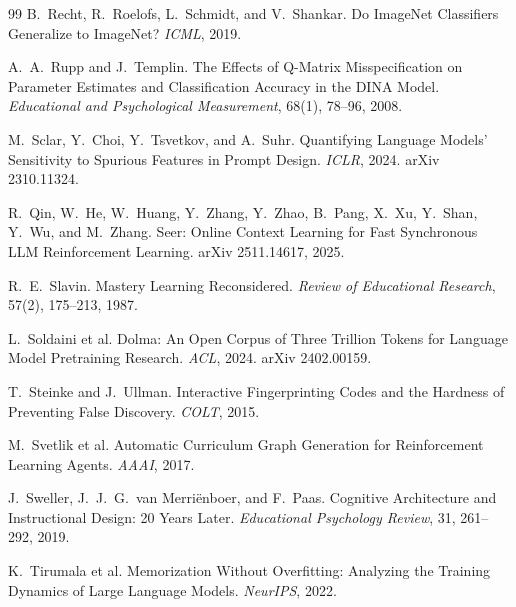 \documentclass[11pt]{article}
\theoremstyle{plain}
\theoremstyle{definition}
\theoremstyle{remark}
\begin{document}
\begin{thebibliography}{99}
 B.~Recht, R.~Roelofs, L.~Schmidt, and V.~Shankar. Do
ImageNet Classifiers Generalize to ImageNet? \emph{ICML}, 2019.

 A.~A.~Rupp and J.~Templin. The Effects of
Q-Matrix Misspecification on Parameter Estimates and Classification Accuracy in the DINA Model.
\emph{Educational and Psychological Measurement}, 68(1), 78--96, 2008.

 M.~Sclar, Y.~Choi, Y.~Tsvetkov, and A.~Suhr.
Quantifying Language Models' Sensitivity to Spurious Features in Prompt Design. \emph{ICLR}, 2024.
arXiv 2310.11324.

 R.~Qin, W.~He, W.~Huang, Y.~Zhang, Y.~Zhao, B.~Pang, X.~Xu,
Y.~Shan, Y.~Wu, and M.~Zhang. Seer: Online Context Learning for Fast Synchronous LLM Reinforcement
Learning. arXiv 2511.14617, 2025.

 R.~E.~Slavin. Mastery Learning Reconsidered.
\emph{Review of Educational Research}, 57(2), 175--213, 1987.

 L.~Soldaini et al. Dolma: An Open Corpus of Three
Trillion Tokens for Language Model Pretraining Research. \emph{ACL}, 2024. arXiv 2402.00159.

 T.~Steinke and J.~Ullman. Interactive
Fingerprinting Codes and the Hardness of Preventing False Discovery. \emph{COLT}, 2015.

 M.~Svetlik et al. Automatic Curriculum Graph Generation
for Reinforcement Learning Agents. \emph{AAAI}, 2017.

 J.~Sweller, J.~J.~G.~van Merri\"enboer, and
F.~Paas. Cognitive Architecture and Instructional Design: 20 Years Later. \emph{Educational
Psychology Review}, 31, 261--292, 2019.

 K.~Tirumala et al. Memorization Without
Overfitting: Analyzing the Training Dynamics of Large Language Models. \emph{NeurIPS}, 2022.


\end{thebibliography}
\end{document}

